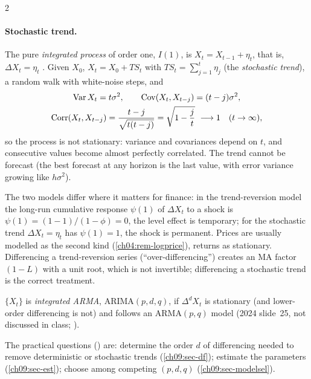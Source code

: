 \begin{paracol}{2}
\paragraph{Stochastic trend.} The pure \emph{integrated process} of order one, $I(1)$, is $X_t=X_{t-1}+\eta_t$, that is,
$\Delta X_t=\eta_t$ . Given $X_0$, $X_t=X_0+TS_t$ with $TS_t=\sum_{j=1}^t\eta_j$ (the
\emph{stochastic trend}), a random walk with white-noise steps, and
\begin{equation}\label{ch09:eq-rwmoments}
  \begin{gathered}
  \Var X_t=t\sigma^2,\qquad \Cov(X_t,X_{t-j})=(t-j)\sigma^2,\\
  \Corr(X_t,X_{t-j})=\frac{t-j}{\sqrt{t(t-j)}}=\sqrt{1-\frac jt}\ \longrightarrow 1\quad(t\to\infty),
  \end{gathered}
\end{equation}
so the process is not stationary: variance and covariances depend on $t$, and consecutive values become
almost perfectly correlated. The trend cannot be forecast (the best forecast at any horizon is the last value, with error
variance growing like $h\sigma^2$).

The two models differ where it matters for finance: in the trend-reversion model the long-run cumulative response
$\psi(1)$ of $\Delta X_t$ to a shock is $\psi(1)=(1-1)/(1-\phi)=0$, the level effect is temporary; for the stochastic trend $\Delta X_t=\eta_t$ has
$\psi(1)=1$, the shock is permanent. Prices are usually modelled as the second kind (\cref{ch04:rem-logprice}),
returns as stationary. Differencing a trend-reversion series (``over-differencing'') creates an MA factor $(1-L)$ with a unit root, which is
not invertible; differencing a stochastic trend is the correct treatment.

\begin{definition}[ARIMA$(p,d,q)$]\label{ch09:def-arima}
$\{X_t\}$ is \emph{integrated ARMA}, ARIMA$(p,d,q)$, if $\Delta^dX_t$ is stationary (and lower-order differencing is not) and
follows an ARMA$(p,q)$ model (2024 slide~25, not discussed in class; ).
\end{definition}
The practical questions () are: determine the order $d$ of differencing needed to remove deterministic or
stochastic trends (\cref{ch09:sec-df}); estimate the parameters (\cref{ch09:sec-est}); choose among competing
$(p,d,q)$ (\cref{ch09:sec-modelsel}).


\end{paracol}

